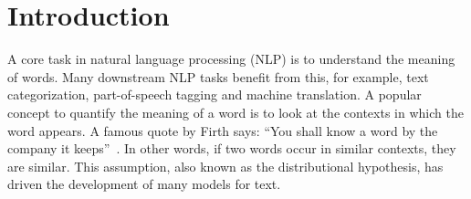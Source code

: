 \documentclass[
        a4paper,
        titlepage,
        twoside,
        parskip,
        numbers=noenddot
        ]{scrbook}
\theoremstyle{break}
\begin{document}
\chapter{Introduction}
\label{sec:introduction}

A core task in natural language processing (NLP) is to understand the meaning of words.
Many downstream NLP tasks benefit from this, for example, text categorization, part-of-speech tagging and machine translation.
A popular concept to quantify the meaning of a word is to look at the contexts in which the word appears.
A famous quote by Firth says: ``You shall know a word by the company it keeps''~\cite{Firth1957}.
In other words, if two words occur in similar contexts, they are similar.
This assumption, also known as the distributional hypothesis, has driven the development of many models for text.
\end{document}
